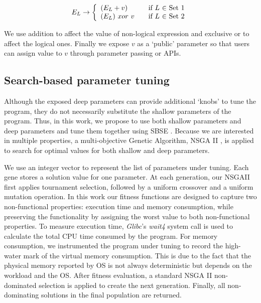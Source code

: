 \begin{equation}
 E_L \rightarrow \left\{
  \begin{array}{l l}
    (E_L + v) & \quad \text{if $L$ $\in$ Set 1}\\
    (E_L) \ xor \ v & \quad \text{if $L$ $\in$ Set 2}
    \end{array} \right.
\end{equation}

We use addition to affect the value of non-logical expression and exclusive or to affect the logical ones.
Finally we expose $v$ as a `public' parameter so that users can assign value to $v$ through parameter passing or APIs.

\subsection{Search-based parameter tuning}
\label{sec_nsgaii}

Although the exposed deep parameters can provide additional `knobs' \cite{Hoffmann:2011:DKR:1961296.1950390} to tune the program, they do not necessarily substitute the shallow parameters of the program.  Thus, in this work, we propose to use both shallow parameters and deep parameters and tune them together using SBSE \cite{Harman:2007:CSF:1253532.1254729}. Because we are interested in multiple properties, a multi-objective Genetic Algorithm, NSGA II \cite{996017}, is applied to search for optimal values for both shallow and deep parameters.


We use an integer vector to represent the list of parameters under tuning. Each gene stores a solution value for one parameter. At each generation, our NSGAII first applies tournament selection, followed by a uniform crossover and a uniform mutation operation. In this work our fitness functions are designed to capture two non-functional properties: execution time and memory consumption, while preserving the functionality by assigning the worst value to both non-functional properties. To measure execution time, \emph{Glibc}'s \emph{wait4} system call is used to calculate the total CPU time consumed by the program. For memory consumption, we instrumented the program under tuning to record the high-water mark of the virtual memory consumption. This is due to the fact that the physical memory reported by OS is not always deterministic but depends on the workload and the OS. After fitness evaluation, a standard NSGA II non-dominated selection is applied to create the next generation. Finally, all non-dominating solutions in the final population are returned.
